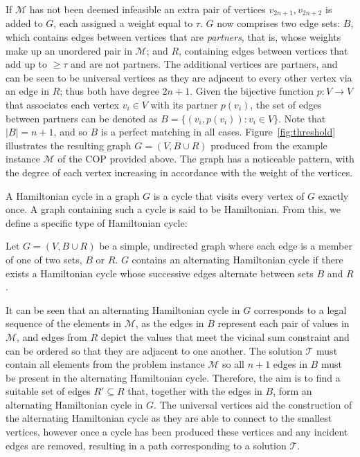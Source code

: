 \documentclass[authoryear]{elsarticle}
\begin{document}
If $\mathcal{M}$ has not been deemed infeasible an extra pair of vertices $v_{2n+1}, v_{2n+2}$ is added to $G$, each assigned a weight equal to $\tau$. $G$ now comprises two edge sets: $B$, which contains edges between vertices that are \emph{partners}, that is, whose weights make up an unordered pair in $\mathcal{M}$; and $R$, containing edges between vertices that add up to $\geq \tau$ and are not partners. The additional vertices are partners, and can be seen to be universal vertices as they are adjacent to every other vertex via an edge in $R$; thus both have degree $2n+1$. Given the bijective function $p : V \to V$ that associates each vertex $v_i \in V$ with its partner $p(v_i)$, the set of edges between partners can be denoted as $B = \{(v_i, p(v_i)) : v_i \in V\}$. Note that $|B| = n+1$, and so $B$ is a perfect matching in all cases. Figure~\ref{fig:threshold} illustrates the resulting graph $G = (V, B \cup R)$ produced from the example instance $\mathcal{M}$ of the COP provided above. The graph has a noticeable pattern, with the degree of each vertex increasing in accordance with the weight of the vertices. 

A Hamiltonian cycle in a graph $G$ is a cycle that visits every vertex of $G$ exactly once. A graph containing such a cycle is said to be Hamiltonian. From this, we define a specific type of Hamiltonian cycle:

\begin{definition} %
	\label{defn:althamcycle}
	Let $G = (V, B \cup R)$ be a simple, undirected graph where each edge is a member of one of two sets, $B$ or $R$. $G$ contains an alternating Hamiltonian cycle if there exists a Hamiltonian cycle whose successive edges alternate between sets $B$ and $R$.
\end{definition}

\noindent It can be seen that an alternating Hamiltonian cycle in $G$ corresponds to a legal sequence of the elements in $\mathcal{M}$, as the edges in $B$ represent each pair of values in $\mathcal{M}$, and edges from $R$ depict the values that meet the vicinal sum constraint and can be ordered so that they are adjacent to one another. The solution $\mathcal{T}$ must contain all elements from the problem instance $\mathcal{M}$ so all $n+1$ edges in $B$ must be present in the alternating Hamiltonian cycle. Therefore, the aim is to find a suitable set of edges $R' \subseteq R$ that, together with the edges in $B$, form an alternating Hamiltonian cycle in $G$. The universal vertices aid the construction of the alternating Hamiltonian cycle as they are able to connect to the smallest vertices, however once a cycle has been produced these vertices and any incident edges are removed, resulting in a path corresponding to a solution $\mathcal{T}$.
\end{document}

